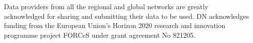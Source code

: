 \documentclass[journal abbreviation, manuscript]{copernicus}
\begin{document}





\begin{acknowledgements}
 Data providers from all the regional and global networks are greatly acknowledged for sharing and submitting their data to be used. DN acknowledges funding from the European Union’s Horizon 2020 research and innovation programme project FORCeS under grant agreement No 821205.
\end{acknowledgements}














\end{document}

